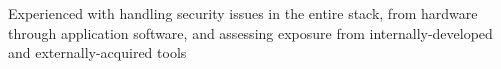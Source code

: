 

\begin{cvparagraph}

Experienced with handling security issues in the entire stack, from hardware through application software, and assessing exposure from internally-developed and externally-acquired tools
\end{cvparagraph}
